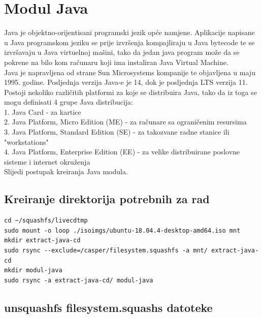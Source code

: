 \documentclass[12pt,vi]{mitthesis}
\begin{document}
\section*{Modul Java}
Java je objektno-orijentisani programski jezik opće namjene. Aplikacije napisane u Java programskom jeziku se prije izvršenja kompajliraju u Java bytecode te se izvršavaju u Java virtuelnoj mašini, tako da jedan java program može da se pokrene na bilo kom računaru koji ima instaliran Java Virtual Machine.\\
Java je napravljena od strane Sun Microsystems kompanije te objavljena u maju 1995. godine. Posljednja verzija Java-e je 14, dok je posljednja LTS verzija 11. Postoji nekoliko različitih platformi za koje se distribuira Java, tako da iz toga se mogu definisati 4 grupe Java distribucija:\\
1. Java Card - za kartice\\
2. Java Platform, Micro Edition (ME) - za računare sa ograničenim resursima\\
3. Java Platform, Standard Edition (SE) - za takozvane radne stanice ili "workstations"\\
4. Java Platform, Enterprise Edition (EE) - za velike distribuirane poslovne sisteme i internet okruženja\\
\indent
Slijedi postupak kreiranja Java modula.

\subsection*{Kreiranje direktorija potrebnih za rad}

\begin{lstlisting}[style=BashInputStyle]
cd ~/squashfs/livecdtmp
sudo mount -o loop ./isoimgs/ubuntu-18.04.4-desktop-amd64.iso mnt
mkdir extract-java-cd
sudo rsync --exclude=/casper/filesystem.squashfs -a mnt/ extract-java-cd
mkdir modul-java
sudo rsync -a extract-java-cd/ modul-java
\end{lstlisting}

\subsection*{unsquashfs filesystem.squashs datoteke}
\end{document}
